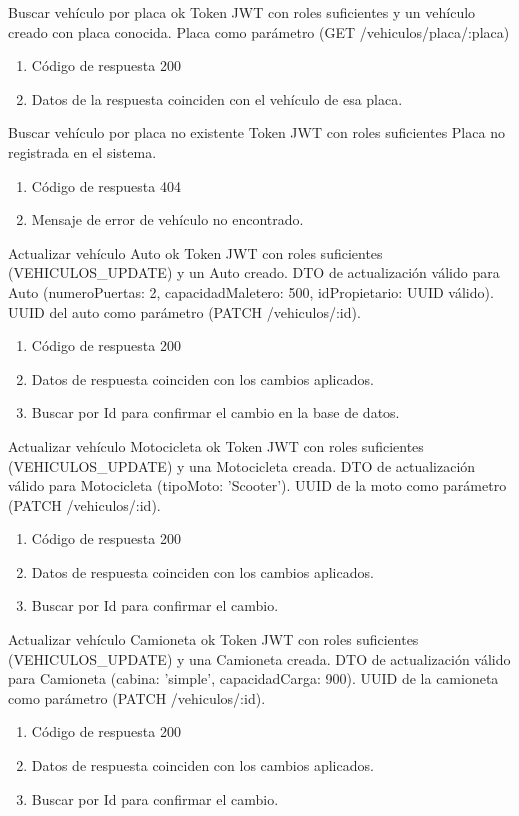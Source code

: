 {Buscar vehículo por placa ok}
{Token JWT con roles suficientes y un vehículo creado con placa conocida.}
{Placa como parámetro (GET /vehiculos/placa/:placa)}
{\begin{enumerate} [leftmargin=*, nosep]
    \item Código de respuesta 200
    \item Datos de la respuesta coinciden con el vehículo de esa placa.
\end{enumerate}}

{Buscar vehículo por placa no existente}
{Token JWT con roles suficientes}
{Placa no registrada en el sistema.}
{\begin{enumerate} [leftmargin=*, nosep]
    \item Código de respuesta 404
    \item Mensaje de error de vehículo no encontrado.
\end{enumerate}}

{Actualizar vehículo Auto ok}
{Token JWT con roles suficientes (VEHICULOS\_UPDATE) y un Auto creado.}
{DTO de actualización válido para Auto (numeroPuertas: 2, capacidadMaletero: 500, idPropietario: UUID válido). UUID del auto como parámetro (PATCH /vehiculos/:id).}
{\begin{enumerate} [leftmargin=*, nosep]
    \item Código de respuesta 200
    \item Datos de respuesta coinciden con los cambios aplicados.
    \item Buscar por Id para confirmar el cambio en la base de datos.
\end{enumerate}}

{Actualizar vehículo Motocicleta ok}
{Token JWT con roles suficientes (VEHICULOS\_UPDATE) y una Motocicleta creada.}
{DTO de actualización válido para Motocicleta (tipoMoto: 'Scooter'). UUID de la moto como parámetro (PATCH /vehiculos/:id).}
{\begin{enumerate} [leftmargin=*, nosep]
    \item Código de respuesta 200
    \item Datos de respuesta coinciden con los cambios aplicados.
    \item Buscar por Id para confirmar el cambio.
\end{enumerate}}

{Actualizar vehículo Camioneta ok}
{Token JWT con roles suficientes (VEHICULOS\_UPDATE) y una Camioneta creada.}
{DTO de actualización válido para Camioneta (cabina: 'simple', capacidadCarga: 900). UUID de la camioneta como parámetro (PATCH /vehiculos/:id).}
{\begin{enumerate} [leftmargin=*, nosep]
    \item Código de respuesta 200
    \item Datos de respuesta coinciden con los cambios aplicados.
    \item Buscar por Id para confirmar el cambio.
\end{enumerate}}

